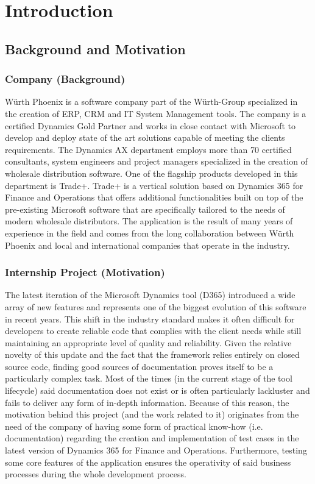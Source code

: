 \chapter{Introduction}

\section{Background and Motivation} 

\subsection{Company (Background)}
Würth Phoenix is a software company part of the Würth-Group specialized in the creation of ERP, CRM and IT System Management tools. The company is a certified Dynamics Gold Partner and works in close contact with Microsoft to develop and deploy state of the art solutions capable of meeting the clients requirements. The Dynamics AX department employs more than 70 certified consultants, system engineers and project managers specialized in the creation of wholesale distribution software. One of the flagship products developed in this department is Trade+. Trade+ is a vertical solution based on Dynamics 365 for Finance and Operations that offers additional functionalities built on top of the pre-existing Microsoft software that are specifically tailored to the needs of modern wholesale distributors. The application is the result of many years of experience in the field and comes from the long collaboration between Würth Phoenix and local and international companies that operate in the industry.

\subsection{Internship Project (Motivation)}
The latest iteration of the Microsoft Dynamics tool (D365) introduced a wide array of new features and represents one of the biggest evolution of this software in recent years. This shift in the industry standard makes it often difficult for developers to create reliable code that complies with the client needs while still maintaining an appropriate level of quality and reliability. Given the relative novelty of this update and the fact that the framework relies entirely on closed source code, finding good sources of documentation proves itself to be a particularly complex task. Most of the times (in the current stage of the tool lifecycle) said documentation does not exist or is often particularly lackluster and fails to deliver any form of in-depth information. Because of this reason, the motivation behind this project (and the work related to it) originates from the need of the company of having some form of practical know-how (i.e. documentation) regarding the creation and implementation of test cases in the latest version of Dynamics 365 for Finance and Operations. Furthermore, testing some core features of the application ensures the operativity of said business processes during the whole development process.

